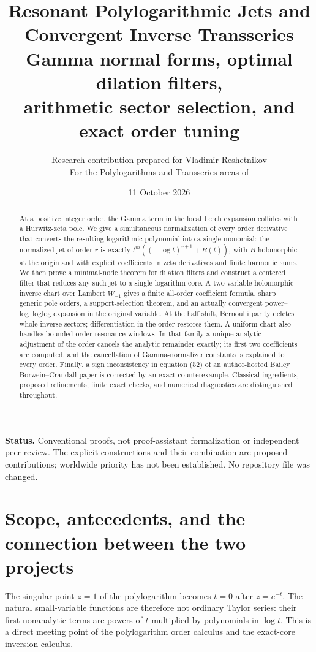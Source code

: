 \documentclass[11pt,a4paper]{article}
\title{\textbf{Resonant Polylogarithmic Jets and\\Convergent Inverse Transseries}\\[7pt]
\large Gamma normal forms, optimal dilation filters,\\arithmetic sector selection, and exact order tuning}
\author{Research contribution prepared for Vladimir Reshetnikov\\
\small For the Polylogarithms and Transseries areas of \repo}
\date{11 October 2026}
\numberwithin{equation}{section}
\theoremstyle{definition}\newtheorem{definition}[theorem]{Definition}
\theoremstyle{remark}\newtheorem{remark}[theorem]{Remark}
\begin{document}
\maketitle
\begin{abstract}
At a positive integer order, the Gamma term in the local Lerch expansion collides with a Hurwitz-zeta pole. We give a simultaneous normalization of every order derivative that converts the resulting logarithmic polynomial into a single monomial: the normalized jet of order $r$ is exactly $t^m(( -\log t)^{r+1}+B(t))$, with $B$ holomorphic at the origin and with explicit coefficients in zeta derivatives and finite harmonic sums. We then prove a minimal-node theorem for dilation filters and construct a centered filter that reduces any such jet to a single-logarithm core. A two-variable holomorphic inverse chart over Lambert $W_{-1}$ gives a finite all-order coefficient formula, sharp generic pole orders, a support-selection theorem, and an actually convergent power--log--loglog expansion in the original variable. At the half shift, Bernoulli parity deletes whole inverse sectors; differentiation in the order restores them. A uniform chart also handles bounded order-resonance windows. In that family a unique analytic adjustment of the order cancels the analytic remainder exactly; its first two coefficients are computed, and the cancellation of Gamma-normalizer constants is explained to every order. Finally, a sign inconsistency in equation (52) of an author-hosted Bailey--Borwein--Crandall paper is corrected by an exact counterexample. Classical ingredients, proposed refinements, finite exact checks, and numerical diagnostics are distinguished throughout.
\end{abstract}
\vspace{3pt}
\noindent\textbf{Status.} Conventional proofs, not proof-assistant formalization or independent peer review. The explicit constructions and their combination are proposed contributions; worldwide priority has not been established. No repository file was changed.
\newpage
\tableofcontents
\newpage

\section{Scope, antecedents, and the connection between the two projects}
\label{rpt:sec:scope}

The singular point $z=1$ of the polylogarithm becomes $t=0$ after $z=e^{-t}$. The natural small-variable functions are therefore not ordinary Taylor series: their first nonanalytic terms are powers of $t$ multiplied by polynomials in $\log t$. This is a direct meeting point of the polylogarithm order calculus and the exact-core inversion calculus.
\end{document}
